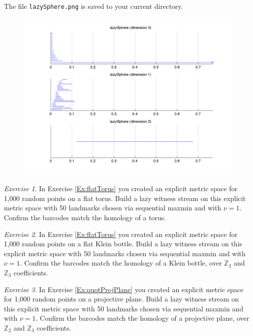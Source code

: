 \documentclass[amscd, amssymb, verbatim]{amsart}[12pt]
\theoremstyle{remark}
\newtheorem{exercise}{Exercise}
\theoremstyle{remark}
\theoremstyle{remark}
\begin{document}
The file \texttt{lazySphere.png} is saved to your current directory.

\begin{figure}[htp]
	\begin{center}
    	\includegraphics[width=6in]{lazySphere.png}
   	\end{center}
\end{figure}
\FloatBarrier

\begin{exercise}\label{Ex:flatTorusLazy}
In Exercise \ref{Ex:flatTorus} you created an explicit metric space for 1,000 random points on a flat torus. Build a lazy witness stream on this explicit metric space with 50 landmarks chosen via sequential maxmin and with $\nu = 1$.  Confirm the barcodes match the homology of a torus. 
\end{exercise}

\begin{exercise}\label{Ex:flatKleinLazy}
In Exercise \ref{Ex:flatTorus} you created an explicit metric space for 1,000 random points on a flat Klein bottle. Build a lazy witness stream on this explicit metric space with 50 landmarks chosen via sequential maxmin and with $\nu = 1$.  Confirm the barcodes match the homology of a Klein bottle, over $\mathbb{Z}_2$ and $\mathbb{Z}_3$ coefficients. 
\end{exercise}

\begin{exercise}\label{Ex:quotProjPlaneLazy}
In Exercise \ref{Ex:quotProjPlane} you created an explicit metric space for 1,000 random points on a projective plane. Build a lazy witness stream on this explicit metric space with 50 landmarks chosen via sequential maxmin and with $\nu = 1$.  Confirm the barcodes match the homology of a projective plane, over $\mathbb{Z}_2$ and $\mathbb{Z}_3$ coefficients. 
\end{exercise}
\end{document}
